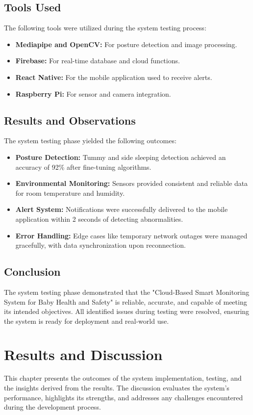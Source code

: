 \documentclass[12pt,a4paper]{report}
\begin{document}
\section{Tools Used}
The following tools were utilized during the system testing process:
\begin{itemize}
    \item \textbf{Mediapipe and OpenCV:} For posture detection and image processing.
    \item \textbf{Firebase:} For real-time database and cloud functions.
    \item \textbf{React Native:} For the mobile application used to receive alerts.
    \item \textbf{Raspberry Pi:} For sensor and camera integration.
\end{itemize}

\section{Results and Observations}
The system testing phase yielded the following outcomes:
\begin{itemize}
    \item \textbf{Posture Detection:} Tummy and side sleeping detection achieved an accuracy of 92\% after fine-tuning algorithms.
    \item \textbf{Environmental Monitoring:} Sensors provided consistent and reliable data for room temperature and humidity.
    \item \textbf{Alert System:} Notifications were successfully delivered to the mobile application within 2 seconds of detecting abnormalities.
    \item \textbf{Error Handling:} Edge cases like temporary network outages were managed gracefully, with data synchronization upon reconnection.
\end{itemize}

\section{Conclusion}
The system testing phase demonstrated that the "Cloud-Based Smart Monitoring System for Baby Health and Safety" is reliable, accurate, and capable of meeting its intended objectives. All identified issues during testing were resolved, ensuring the system is ready for deployment and real-world use.


\chapter{Results and Discussion}
This chapter presents the outcomes of the system implementation, testing, and the insights derived from the results. The discussion evaluates the system's performance, highlights its strengths, and addresses any challenges encountered during the development process.
\end{document}
